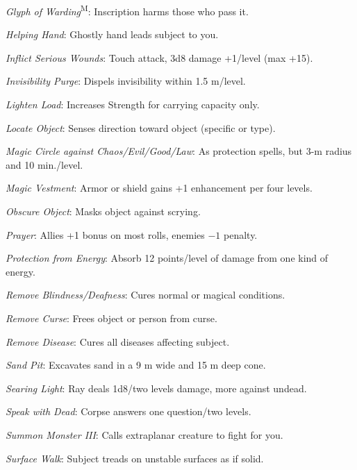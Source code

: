 \textit{Glyph of Warding}\textsuperscript{M}: Inscription harms those who pass it.

\textit{Helping Hand}: Ghostly hand leads subject to you.

\textit{Inflict Serious Wounds}: Touch attack, 3d8 damage +1/level (max +15).

\textit{Invisibility Purge}: Dispels invisibility within 1.5 m/level.

\textit{Lighten Load}: Increases Strength for carrying capacity only.

\textit{Locate Object}: Senses direction toward object (specific or type).

\textit{Magic Circle against Chaos/Evil/Good/Law}: As protection spells, but 3-m radius and 10 min./level.

\textit{Magic Vestment}: Armor or shield gains +1 enhancement per four levels.


\textit{Obscure Object}: Masks object against scrying.

\textit{Prayer}: Allies +1 bonus on most rolls, enemies $-1$ penalty.

\textit{Protection from Energy}: Absorb 12 points/level of damage from one kind of energy.

\textit{Remove Blindness/Deafness}: Cures normal or magical conditions.

\textit{Remove Curse}: Frees object or person from curse.

\textit{Remove Disease}: Cures all diseases affecting subject.

\textit{Sand Pit}: Excavates sand in a 9 m wide and 15 m deep cone.

\textit{Searing Light}: Ray deals 1d8/two levels damage, more against undead.

\textit{Speak with Dead}: Corpse answers one question/two levels.


\textit{Summon Monster III}: Calls extraplanar creature to fight for you.

\textit{Surface Walk}: Subject treads on unstable surfaces as if solid.






